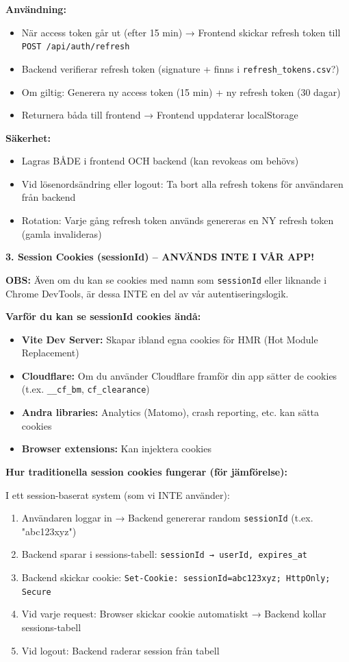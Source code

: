 \documentclass[12pt,a4paper]{article}
\begin{document}
\textbf{Användning:}
\begin{itemize}[noitemsep]
  \item När access token går ut (efter 15 min) → Frontend skickar refresh token till \texttt{POST /api/auth/refresh}
  \item Backend verifierar refresh token (signature + finns i \texttt{refresh\_tokens.csv}?)
  \item Om giltig: Generera ny access token (15 min) + ny refresh token (30 dagar)
  \item Returnera båda till frontend → Frontend uppdaterar localStorage
\end{itemize}

\textbf{Säkerhet:}
\begin{itemize}[noitemsep]
  \item Lagras BÅDE i frontend OCH backend (kan revokeas om behövs)
  \item Vid lösenordsändring eller logout: Ta bort alla refresh tokens för användaren från backend
  \item Rotation: Varje gång refresh token används genereras en NY refresh token (gamla invalideras)
\end{itemize}

\textbf{3. Session Cookies (sessionId) -- ANVÄNDS INTE I VÅR APP!}

\textbf{OBS:} Även om du kan se cookies med namn som \texttt{sessionId} eller liknande i 
Chrome DevTools, är dessa INTE en del av vår autentiseringslogik.

\textbf{Varför du kan se sessionId cookies ändå:}
\begin{itemize}[noitemsep]
  \item \textbf{Vite Dev Server:} Skapar ibland egna cookies för HMR (Hot Module Replacement)
  \item \textbf{Cloudflare:} Om du använder Cloudflare framför din app sätter de cookies (t.ex. \texttt{\_\_cf\_bm}, \texttt{cf\_clearance})
  \item \textbf{Andra libraries:} Analytics (Matomo), crash reporting, etc. kan sätta cookies
  \item \textbf{Browser extensions:} Kan injektera cookies
\end{itemize}

\textbf{Hur traditionella session cookies fungerar (för jämförelse):}

I ett session-baserat system (som vi INTE använder):
\begin{enumerate}[noitemsep]
  \item Användaren loggar in → Backend genererar random \texttt{sessionId} (t.ex. "abc123xyz")
  \item Backend sparar i sessions-tabell: \texttt{sessionId → userId, expires\_at}
  \item Backend skickar cookie: \texttt{Set-Cookie: sessionId=abc123xyz; HttpOnly; Secure}
  \item Vid varje request: Browser skickar cookie automatiskt → Backend kollar sessions-tabell
  \item Vid logout: Backend raderar session från tabell
\end{enumerate}
\end{document}
